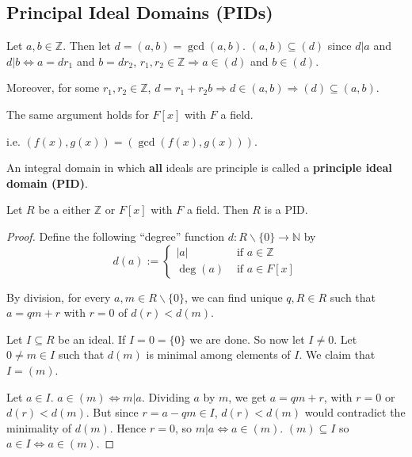 \subsection{Principal Ideal Domains (PIDs)}

\begin{example}
	Let $a, b \in \mathbb{Z}$. Then let $d = (a, b) = \gcd(a, b)$. $(a, b) \subseteq (d)$ since $d | a$ and $d | b \Leftrightarrow a = d r_1$ and $b = d r_2$, $r_1, r_2 \in \mathbb{Z} \Rightarrow a \in (d)$ and $b \in (d)$.

	Moreover, for some $r_1, r_2 \in \mathbb{Z}$, $d = r_1 + r_2 b \Rightarrow d \in (a, b) \Rightarrow (d) \subseteq (a, b)$.


	The same argument holds for $F[x]$ with $F$ a field.

	i.e. $(f(x), g(x)) = (\gcd(f(x), g(x)))$.
\end{example}

\begin{definition}
	An integral domain in which \textbf{all} ideals are principle is called a \textbf{principle ideal domain (PID)}.
\end{definition}

\begin{theorem}
	Let $R$ be a either $\mathbb{Z}$ or $F[x]$ with $F$ a field. Then $R$ is a PID.
\end{theorem}

\begin{proof}
	Define the following ``degree'' function $d: R \backslash \{0\} \rightarrow \mathbb{N}$ by
	\[
		d(a) := \begin{cases}
			|a| & \text{ if } a \in \mathbb{Z} \\
			\deg(a) & \text{ if } a \in F[x]
		\end{cases}
	\]

	By division, for every $a, m \in R \backslash \{0\}$, we can find unique $q, R \in R$ such that $a = qm + r$ with $r = 0$ of $d(r) < d(m)$.

	Let $I \subseteq R$ be an ideal. If $I = 0 = \{0\}$ we are done. So now let $I \ne 0$. Let $0 \ne m \in I$ such that $d(m)$ is minimal among elements of $I$. We claim that $I = (m)$.

	Let $a \in I$. $a \in (m) \Leftrightarrow m | a$. Dividing $a$ by $m$, we get $a = qm + r$, with $r = 0$ or $d(r) < d(m)$. But since $r = a - qm \in I$, $d(r) < d(m)$ would contradict the minimality of $d(m)$. Hence $r = 0$, so $m | a \Leftrightarrow a \in (m)$. $(m) \subseteq I$ so $a \in I \Leftrightarrow a \in (m)$.
\end{proof}

